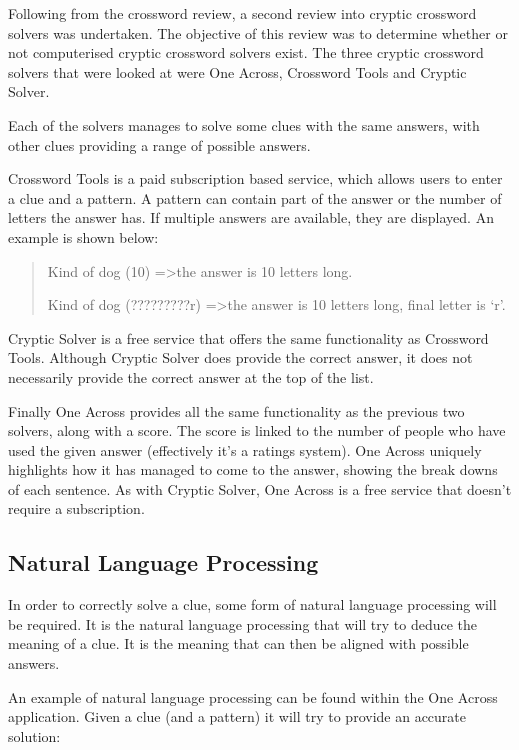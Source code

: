 Following from the crossword review, a second review into cryptic crossword 
solvers was undertaken. The objective of this review was to determine whether 
or not computerised cryptic crossword solvers exist. The three cryptic 
crossword solvers that were looked at were One Across, Crossword Tools and 
Cryptic Solver.

Each of the solvers manages to solve some clues with the same answers, with 
other clues providing a range of possible answers.

Crossword Tools \citep{crosswordtools} is a paid subscription based service, 
which allows users to enter a clue and a pattern. A pattern can contain part of
the answer or the number of letters the answer has. If multiple answers are 
available, they are displayed. An example is shown below:

\begin{quote}
Kind of dog (10) =\textgreater the answer is 10 letters long.

Kind of dog (?????????r) =\textgreater the answer is 10 letters long, final 
letter is `r'.
\end{quote}

Cryptic Solver \citep{crypticsolver} is a free service that offers the same 
functionality as Crossword Tools. Although Cryptic Solver does provide the 
correct answer, it does not necessarily provide the correct answer at the top 
of the list.

Finally One Across \citep{oneacross} provides all the same functionality as the
previous two solvers, along with a score. The score is linked to the number of 
people who have used the given answer (effectively it's a ratings system). One 
Across uniquely highlights how it has managed to come to the answer, showing 
the break downs of each sentence. As with Cryptic Solver, One Across is a free 
service that doesn't require a subscription.


\subsection{Natural Language Processing}

In order to correctly solve a clue, some form of natural language processing 
will be required. It is the natural language processing that will try to deduce 
the meaning of a clue. It is the meaning that can then be aligned with possible 
answers.

An example of natural language processing can be found within the One Across 
application. Given a clue (and a pattern) it will try to provide an accurate 
solution:

